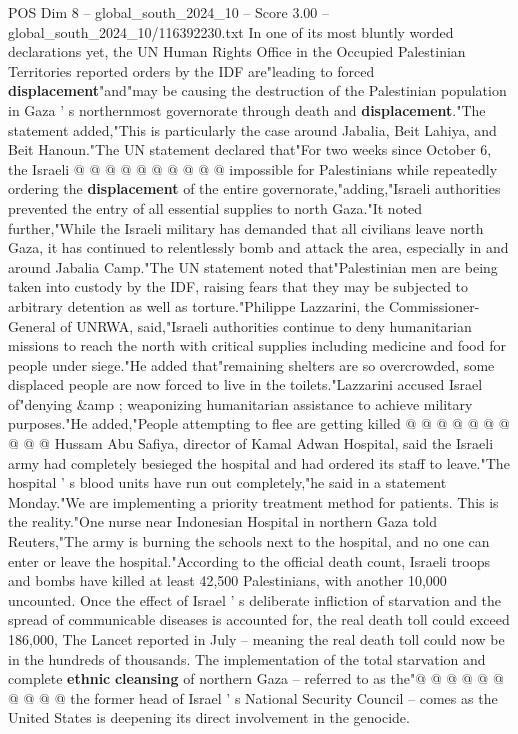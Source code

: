 \begin{textsample}{POS Dim 8 – global\_south\_2024\_10 – Score 3.00 – global\_south\_2024\_10/116392230.txt}
In one of its most bluntly worded declarations yet, the UN Human Rights Office in the Occupied Palestinian Territories reported orders by the IDF are"leading to forced \textbf{displacement}"and"may be causing the destruction of the Palestinian population in Gaza ' s northernmost governorate through death and \textbf{displacement}."The statement added,"This is particularly the case around Jabalia, Beit Lahiya, and Beit Hanoun."The UN statement declared that"For two weeks since October 6, the Israeli @ @ @ @ @ @ @ @ @ @ impossible for Palestinians while repeatedly ordering the \textbf{displacement} of the entire governorate,"adding,"Israeli authorities prevented the entry of all essential supplies to north Gaza."It noted further,"While the Israeli military has demanded that all civilians leave north Gaza, it has continued to relentlessly bomb and attack the area, especially in and around Jabalia Camp."The UN statement noted that"Palestinian men are being taken into custody by the IDF, raising fears that they may be subjected to arbitrary detention as well as torture."Philippe Lazzarini, the Commissioner-General of UNRWA, said,"Israeli authorities continue to deny humanitarian missions to reach the north with critical supplies including medicine and food for people under siege."He added that"remaining shelters are so overcrowded, some displaced people are now forced to live in the toilets."Lazzarini accused Israel of"denying \&amp ; weaponizing humanitarian assistance to achieve military purposes."He added,"People attempting to flee are getting killed @ @ @ @ @ @ @ @ @ @ Hussam Abu Safiya, director of Kamal Adwan Hospital, said the Israeli army had completely besieged the hospital and had ordered its staff to leave."The hospital ' s blood units have run out completely,"he said in a statement Monday."We are implementing a priority treatment method for patients.
This is the reality."One nurse near Indonesian Hospital in northern Gaza told Reuters,"The army is burning the schools next to the hospital, and no one can enter or leave the hospital."According to the official death count, Israeli troops and bombs have killed at least 42,500 Palestinians, with another 10,000 uncounted.
Once the effect of Israel ' s deliberate infliction of starvation and the spread of communicable diseases is accounted for, the real death toll could exceed 186,000, The Lancet reported in July -- meaning the real death toll could now be in the hundreds of thousands.
The implementation of the total starvation and complete \textbf{ethnic} \textbf{cleansing} of northern Gaza -- referred to as the"@ @ @ @ @ @ @ @ @ @ the former head of Israel ' s National Security Council -- comes as the United States is deepening its direct involvement in the genocide.

\end{textsample}
